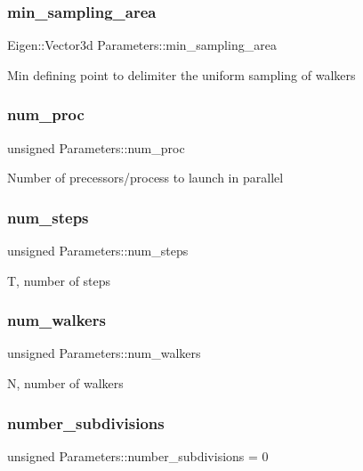 \subsubsection{\texorpdfstring{min\+\_\+sampling\+\_\+area}{min\_sampling\_area}}
{\footnotesize\ttfamily Eigen\+::\+Vector3d Parameters\+::min\+\_\+sampling\+\_\+area}

Min defining point to delimiter the uniform sampling of walkers \mbox{\label{class_parameters_aab0de21efc3f85e5c44205ed5ebf9d4d}} 
\subsubsection{\texorpdfstring{num\+\_\+proc}{num\_proc}}
{\footnotesize\ttfamily unsigned Parameters\+::num\+\_\+proc}

Number of precessors/process to launch in parallel \mbox{\label{class_parameters_a3475e7efae778bc7720fe6c17274eef0}} 
\subsubsection{\texorpdfstring{num\+\_\+steps}{num\_steps}}
{\footnotesize\ttfamily unsigned Parameters\+::num\+\_\+steps}

T, number of steps \mbox{\label{class_parameters_a35329cc60a28986ee4020457d46921fb}} 
\subsubsection{\texorpdfstring{num\+\_\+walkers}{num\_walkers}}
{\footnotesize\ttfamily unsigned Parameters\+::num\+\_\+walkers}

N, number of walkers \mbox{\label{class_parameters_a0d15fd8f1f5c332174864c3acbaf5e10}} 
\subsubsection{\texorpdfstring{number\+\_\+subdivisions}{number\_subdivisions}}
{\footnotesize\ttfamily unsigned Parameters\+::number\+\_\+subdivisions = 0}

